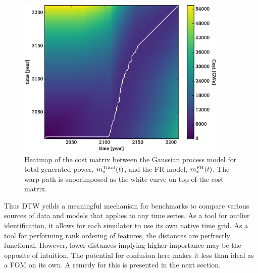 \begin{figure}[htb]
\centering
\includegraphics[width=0.9\textwidth]{cost-total-model-to-fr-model.eps}
\caption{Heatmap of the cost matrix between the Gaussian process model 
for total generated power, $m_*^{\mathrm{Total}}(t)$, and the FR model, 
$m_*^{\mathrm{FR}}(t)$.
The warp path is superimposed as the white curve on top of the cost matrix.}
\label{cost-total-model-to-fr-model}
\end{figure}

Thus DTW yeilds a meaningful mechanism for benchmarks to compare various
sources of data and models that applies to any time series.  As a tool for
outlier identification, it allows for each simulator to use its own native 
time grid. As a tool for performing rank ordering of features, the distances
are perfrectly functional. However, lower distances implying higher 
importance may be the opposite of intuition. The potential for confusion here
makes it less than ideal as a FOM on its own. A remedy for this is presented
in the next section.
